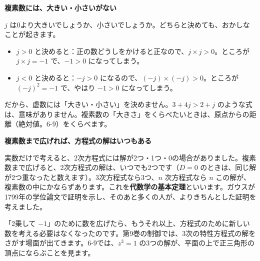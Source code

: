 \begin{motto}[4]
\textbf{複素数には、大きい・小さいがない}\par
$j$ は0より大きいでしょうか、小さいでしょうか。どちらと決めても、おかしなことが起きます。
\begin{itemize}[leftmargin=1.2\zw, itemsep=2pt, topsep=2pt, label={\color{bkGray}●}]
\item $j>0$ と決めると：正の数どうしをかけると正なので、$j\times j>0$。ところが $j\times j=-1$ で、$-1>0$ になってしまう。
\item $j<0$ と決めると：$-j>0$ になるので、$(-j)\times(-j)>0$。ところが $(-j)^2=-1$ で、やはり $-1>0$ になってしまう。
\end{itemize}
だから、虚数には「大きい・小さい」を決めません。$3+4j>2+j$ のような式は、意味がありません。複素数の「大きさ」をくらべたいときは、原点からの距離（絶対値。6-9）をくらべます。
\end{motto}

\begin{motto}[4]
\textbf{複素数まで広げれば、方程式の解はいつもある}\par
実数だけで考えると、2次方程式には解が2つ・1つ・0の場合がありました。複素数まで広げると、2次方程式の解は、いつでも2つです（$D=0$ のときは、同じ解が2つ重なったと数えます）。3次方程式なら3つ、$n$ 次方程式なら $n$ この解が、複素数の中にかならずあります。これを\textbf{代数学の基本定理}といいます。ガウスが1799年の学位論文で証明を示し、そのあと多くの人が、よりきちんとした証明を考えました。
\par\vspace{3pt}
「2乗して $-1$」のために数を広げたら、もうそれ以上、方程式のために新しい数を考える必要はなくなったのです。第9巻の制御では、3次の特性方程式の解をさがす場面が出てきます。6-9では、$z^3=1$ の3つの解が、平面の上で正三角形の頂点にならぶことを見ます。
\end{motto}




\begin{kotoba}
\small
{}
\end{kotoba}

